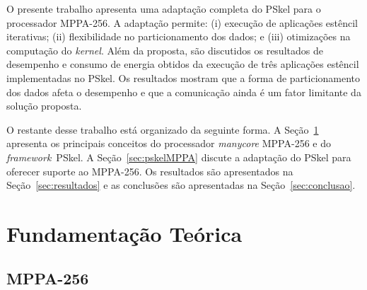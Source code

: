 \documentclass[12pt]{article}
\newcommand{\fw}{\textit{framework}\xspace}
\newcommand{\pskel}{\small \textsf{PSkel}\xspace}
\newcommand{\mppa}{\small \textsf{MPPA-256}\xspace}
\begin{document}
O presente trabalho apresenta uma adaptação completa do \pskel para o
processador \mppa. A adaptação permite: (i) execução de
aplicações estêncil iterativas; (ii) flexibilidade no particionamento dos dados;
e (iii) otimizações na computação do \textit{kernel}. Além da proposta, são
discutidos os resultados de desempenho e consumo de energia obtidos da execução
de três aplicações estêncil implementadas no \pskel. Os resultados mostram que a
forma de particionamento dos dados afeta o desempenho e que a comunicação ainda
é um fator limitante da solução proposta.

O restante desse trabalho está organizado da seguinte forma. A
Seção~\ref{sec:fundamentacao} apresenta
os principais conceitos do processador \textit{manycore} \mppa e do \fw \
\pskel.
A Seção~\ref{sec:pskelMPPA} discute a adaptação do \pskel para oferecer suporte
ao \mppa.
Os resultados são apresentados na Seção~\ref{sec:resultados} e as conclusões são
apresentadas na Seção~\ref{sec:conclusao}.


\section{Fundamentação Teórica}
\label{sec:fundamentacao}



\subsection{MPPA-256}
\label{subsec:mppa}
\end{document}
